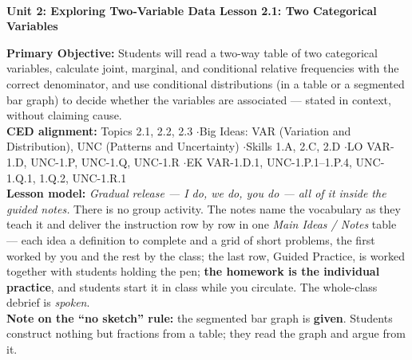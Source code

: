 \documentclass[10pt]{article}
\newcommand{\UnitNumberName}{Unit 2: Exploring Two-Variable Data \quad}
\newcommand{\LessonNumberName}{Lesson 2.1: Two Categorical Variables}
\begin{document}
\begin{center}
    {\Large\bfseries \CourseName \\
    {\small\bfseries \UnitNumberName \LessonNumberName}}
\end{center}

\begin{tcolorbox}[colback=sky, colframe=navy, boxrule=0.9pt, arc=2mm,
    left=2mm, right=2mm, top=1.5mm, bottom=1.5mm]
    \textbf{Primary Objective:} Students will read a two-way table of two categorical variables,
    calculate joint, marginal, and conditional relative frequencies with the correct
    denominator, and use conditional distributions (in a table or a segmented bar graph) to
    decide whether the variables are associated --- stated in context, without claiming cause.
    \\[2pt]
    \textbf{CED alignment:} Topics 2.1, 2.2, 2.3 \quad$\cdot$\quad Big Ideas: VAR (Variation and
    Distribution), UNC (Patterns and Uncertainty) \quad$\cdot$\quad Skills 1.A, 2.C, 2.D
    \quad$\cdot$\quad LO VAR-1.D, UNC-1.P, UNC-1.Q, UNC-1.R \quad$\cdot$\quad EK VAR-1.D.1,
    UNC-1.P.1--1.P.4, UNC-1.Q.1, 1.Q.2, UNC-1.R.1
    \\[2pt]
    \textbf{Lesson model:} \emph{Gradual release --- I do, we do, you do --- all of it inside
    the guided notes.} There is no group activity. The notes name the vocabulary as they teach
    it and deliver the instruction row by row in one \emph{Main Ideas / Notes} table --- each
    idea a definition to complete and a grid of short problems, the first worked by you and the
    rest by the class; the last row, Guided Practice, is worked together with students holding
    the pen; \textbf{the homework is the individual practice}, and students start it in class
    while you circulate. The whole-class debrief is \emph{spoken}.
    \\[2pt]
    \textbf{Note on the ``no sketch'' rule:} the segmented bar graph is \textbf{given}. Students
    construct nothing but fractions from a table; they read the graph and argue from it.
\end{tcolorbox}
\end{document}
